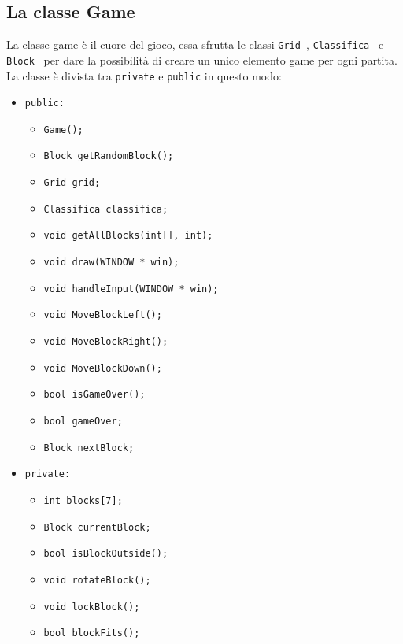 \documentclass[a4paper]{article}
\begin{document}
\subsection{La classe Game}
La classe game è il cuore del gioco, essa sfrutta le classi \color{cyan}\verb!Grid !\color{black},  \color{cyan}\verb!Classifica !\color{black} e \color{cyan}\verb!Block !\color{black} per dare la possibilità di creare un unico elemento game per ogni partita.\\ 
La classe è divista tra \verb!private! e \verb!public! in questo modo:
\begin{itemize}
    \item \verb!public: !
    \begin{itemize}
        \item \verb!Game();!
        \item \verb!Block getRandomBlock();!
        \item \verb!Grid grid;!
        \item \verb!Classifica classifica;!
        \item \verb!void getAllBlocks(int[], int);!
        \item \verb!void draw(WINDOW * win);!
        \item \verb!void handleInput(WINDOW * win);!
        \item \verb!void MoveBlockLeft();!
        \item \verb!void MoveBlockRight();!
        \item \verb!void MoveBlockDown();!
        \item \verb!bool isGameOver();!
        \item \verb!bool gameOver;!
        \item \verb!Block nextBlock;!
    \end{itemize}
    \item \verb!private:!
        \begin{itemize}
            \item \verb!int blocks[7];!
            \item \verb!Block currentBlock;!
            \item \verb!bool isBlockOutside();!
            \item \verb!void rotateBlock();!
            \item \verb!void lockBlock();!
            \item \verb!bool blockFits();!
        \end{itemize}
\end{itemize}
\end{document}

